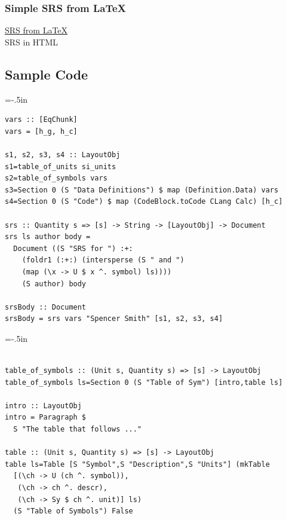 \documentclass{beamer}
\begin{document}

\begin{frame}[fragile]

\frametitle{Simple SRS from LaTeX}

\href{run:SRS.pdf}{SRS from LaTeX}\\
{SRS in HTML}

\end{frame}


\subsection[Code]{Sample Code}


\hoffset=-.5in %

\begin{frame}


\begin{lstlisting}
vars :: [EqChunk]
vars = [h_g, h_c]

s1, s2, s3, s4 :: LayoutObj
s1=table_of_units si_units
s2=table_of_symbols vars
s3=Section 0 (S "Data Definitions") $ map (Definition.Data) vars
s4=Section 0 (S "Code") $ map (CodeBlock.toCode CLang Calc) [h_c]

srs :: Quantity s => [s] -> String -> [LayoutObj] -> Document
srs ls author body =
  Document ((S "SRS for ") :+: 
    (foldr1 (:+:) (intersperse (S " and ") 
    (map (\x -> U $ x ^. symbol) ls))))
    (S author) body  
  
srsBody :: Document
srsBody = srs vars "Spencer Smith" [s1, s2, s3, s4]
\end{lstlisting}
\end{frame}

\hoffset=0in %

\hoffset=-.5in %

\begin{frame}


\begin{lstlisting}

table_of_symbols :: (Unit s, Quantity s) => [s] -> LayoutObj
table_of_symbols ls=Section 0 (S "Table of Sym") [intro,table ls]

intro :: LayoutObj
intro = Paragraph $ 
  S "The table that follows ..."
  
table :: (Unit s, Quantity s) => [s] -> LayoutObj
table ls=Table [S "Symbol",S "Description",S "Units"] (mkTable
  [(\ch -> U (ch ^. symbol)), 
   (\ch -> ch ^. descr), 
   (\ch -> Sy $ ch ^. unit)] ls)
  (S "Table of Symbols") False

\end{lstlisting}
\end{frame}
\end{document}
